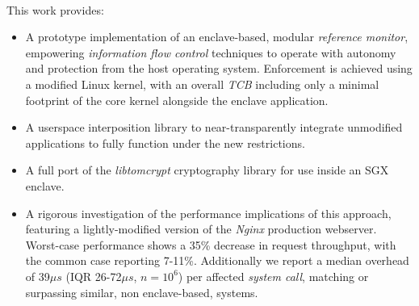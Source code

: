 \paragraph{} This work provides:
\begin{itemize}
    \item A prototype implementation of an enclave-based, modular \textit{reference monitor}, empowering \textit{information flow control} techniques to operate with autonomy and protection from the host operating system. Enforcement is achieved using a modified Linux kernel, with an overall \textit{TCB} including only a minimal footprint of the core kernel alongside the enclave application.
    \item A userspace interposition library to near-transparently integrate unmodified applications to fully function under the new restrictions.
    \item A full port of the \textit{libtomcrypt} cryptography library for use inside an SGX enclave.
    \item A rigorous investigation of the performance implications of this approach, featuring a lightly-modified version of the \textit{Nginx} production webserver. Worst-case performance shows a 35\% decrease in request throughput, with the common case reporting 7-11\%. Additionally we report a median overhead of 39$\mu s$ (IQR 26-72$\mu s$, $n = 10^6$) per affected \textit{system call}, matching or surpassing similar, non enclave-based, systems.
\end{itemize}
